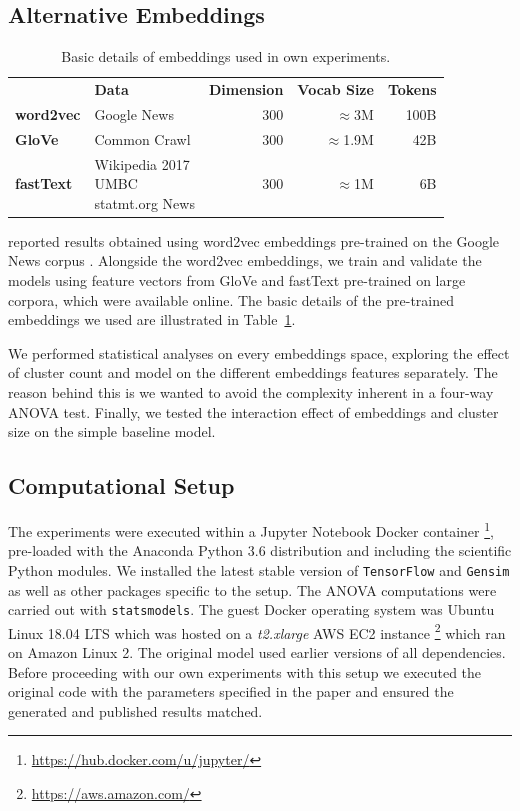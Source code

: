 \subsection{Alternative Embeddings}
\begin{table}\centering
    \begin{tabular}{@{}llrrr@{}} \toprule
    & \textbf{Data} & \textbf{Dimension} & \textbf{Vocab Size} & \textbf{Tokens} \\ \cmidrule{2-5}
    \textbf{word2vec} & Google News & 300 & $\approx$3M & 100B \\ \midrule
    \textbf{GloVe} & Common Crawl & 300 & $\approx$1.9M & 42B \\ \midrule
    \textbf{fastText} & \shortstack[l]{Wikipedia 2017\\UMBC\\statmt.org News} & 300 & $\approx$1M & 6B \\
    \bottomrule
    \end{tabular}
    \caption{Basic details of embeddings used in own experiments.}\label{tab:experiment_embeddings}
\end{table}

\citeauthor{ustalov2017negative} reported results obtained using word2vec embeddings pre-trained on the Google News corpus \citep{mikolov2013efficient}.  Alongside the word2vec embeddings, we train and validate the models using feature vectors from GloVe \citep{pennington2014glove} and fastText \citep{bojanowski2017enriching} pre-trained on large corpora, which were available online.  The basic details of the pre-trained embeddings we used are illustrated in Table~\ref{tab:experiment_embeddings}.

We performed statistical analyses on every embeddings space, exploring the effect of cluster count and model on the different embeddings features separately.  The reason behind this is we wanted to avoid the complexity inherent in a four-way \ac{ANOVA} test.  Finally, we tested the interaction effect of embeddings and cluster size on the simple baseline model.

\subsection{Computational Setup} \label{computational_setup_orig}
The experiments were executed within a Jupyter Notebook Docker container \footnote{\url{https://hub.docker.com/u/jupyter/}}, pre-loaded with the Anaconda Python 3.6 distribution and including the scientific Python modules.  We installed the latest stable version of \texttt{TensorFlow} \citep{tensorflow2015-whitepaper} and \texttt{Gensim} \citep{rehurek_lrec} as well as other packages specific to the \citep{ustalov2017negative} setup.  The \ac{ANOVA} computations were carried out with \texttt{statsmodels}.
The guest Docker operating system was Ubuntu Linux 18.04 LTS which was hosted on a \textit{t2.xlarge} AWS EC2 instance \footnote{\url{https://aws.amazon.com/}} which ran on Amazon Linux 2.  The original model used earlier versions of all dependencies.  Before proceeding with our own experiments with this setup we executed the original code with the parameters specified in the paper and ensured the generated and published results matched.

